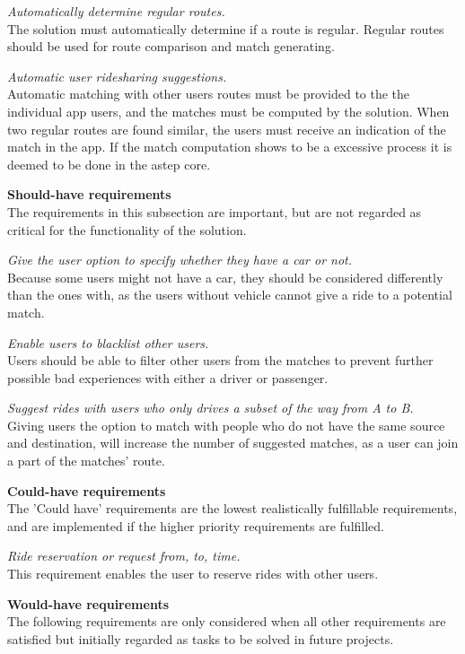 \textit{Automatically determine regular routes.}\\
The solution must automatically determine if a route is regular. 
Regular routes should be used for route comparison and match generating. 

\textit{Automatic user ridesharing suggestions.}\\
Automatic matching with other users routes must be provided to the the individual app users, and the matches must be computed by the solution.
When two regular routes are found similar, the users must receive an indication of the match in the app.
If the match computation shows to be a excessive process it is deemed to be done in the \gls{astep} core.


\textbf{Should-have requirements}\\
The requirements in this subsection are important, but are not regarded as critical for the functionality of the solution.

\textit{Give the user option to specify whether they have a car or not.}\\
Because some users might not have a car, they should be considered differently than the ones with, as the users without vehicle cannot give a ride to a potential match.

\textit{Enable users to blacklist other users.}\\
Users should be able to filter other users from the matches to prevent further possible bad experiences with either a driver or passenger.

\textit{Suggest rides with users who only drives a subset of the way from A to B.}\\
Giving users the option to match with people who do not have the same source and destination, will increase the number of suggested matches, as a user can join a part of the matches' route.


\textbf{Could-have requirements}\\
The 'Could have' requirements are the lowest realistically fulfillable requirements, and are implemented if the higher priority requirements are fulfilled.

\textit{Ride reservation or request from, to, time.}\\
This requirement enables the user to reserve rides with other users. 

\textbf{Would-have requirements}\\
The following requirements are only considered when all other requirements are satisfied but initially regarded as tasks to be solved in future projects.

